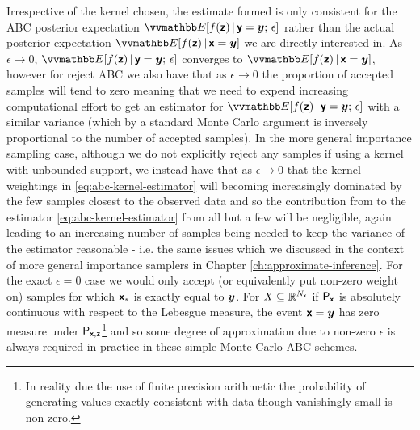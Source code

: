 


Irrespective of the kernel chosen, the estimate formed is only consistent for the \ac{ABC} posterior expectation $\expc{f(\rvct{z}) \gvn \rvct{y} = \vct{y};\,\epsilon}$ rather than the actual posterior expectation $\expc{f(\rvct{z}) \gvn \rvct{x} = \vct{y}}$ we are directly interested in. As $\epsilon \to 0$, $\expc{f(\rvct{z}) \gvn \rvct{y} = \vct{y};\,\epsilon}$ converges to $\expc{f(\rvct{z}) \gvn \rvct{x} = \vct{y}}$, however for reject \ac{ABC} we also have that as $\epsilon \to 0$ the proportion of accepted samples will tend to zero meaning that we need to expend increasing computational effort to get an estimator for $\expc{f(\rvct{z}) \gvn \rvct{y} = \vct{y};\,\epsilon}$ with a similar variance (which by a standard Monte Carlo argument is inversely proportional to the number of accepted samples). In the more general importance sampling case, although we do not explicitly reject any samples if using a kernel with unbounded support, we instead have that as $\epsilon \to 0$ that the kernel weightings in \eqref{eq:abc-kernel-estimator} will becoming increasingly dominated by the few samples closest to the observed data and so the contribution from to the estimator \eqref{eq:abc-kernel-estimator} from all but a few will be negligible, again leading to an increasing number of samples being needed to keep the variance of the estimator reasonable - i.e. the same issues which we discussed in the context of more general importance samplers in Chapter \ref{ch:approximate-inference}. For the exact $\epsilon = 0$ case we would only accept (or equivalently put non-zero weight on) samples for which $\boldsymbol{\mathsf{x}}_s$ is exactly equal to $\boldsymbol{y}$. For $\mathit{X} \subseteq \mathbb{R}^{N_{\boldsymbol{\mathsf{x}}}}$ if $\mathsf{P}_{\boldsymbol{\mathsf{x}}}$ is absolutely continuous with respect to the Lebesgue measure, the event $\boldsymbol{\mathsf{x}} = \boldsymbol{y}$ has zero measure under $\mathsf{P}_{\boldsymbol{\mathsf{x}},\boldsymbol{\mathsf{z}}}$\footnote{In reality due the use of finite precision arithmetic the probability of generating values exactly consistent with data though vanishingly small is non-zero.} and so some degree of approximation due to non-zero $\epsilon$ is always required in practice in these simple Monte Carlo \ac{ABC} schemes.

